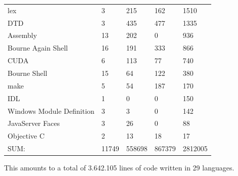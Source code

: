 \begin{center}
\begin{tabular}{ l|l|l|l|l }
	lex                                   &   3         &   215         &   162        &   1510\\
	DTD                                   &   3         &   435         &   477        &   1335\\
	Assembly                              &  13         &   202         &     0        &    936\\
	Bourne Again Shell                    &  16         &   191         &   333        &    866\\
	CUDA                                  &   6         &   113         &    77        &    740\\
	Bourne Shell                          &  15         &    64         &   122        &    380\\
	make                                  &   5         &    54         &   187        &    170\\
	IDL                                   &   1         &     0         &     0        &    150\\
	Windows Module Definition             &   3         &     3         &     0        &    142\\
	JavaServer Faces                      &   3         &    26         &     0        &     88\\
	Objective C                           &   2         &    13         &    18        &     17\\
	\hline
	SUM:                                 &11749         &558698         &867379        &2812005\\
	\hline
\end{tabular}
\end{center}

This amounts to a total of 3.642.105 lines of code written in 29 languages.
